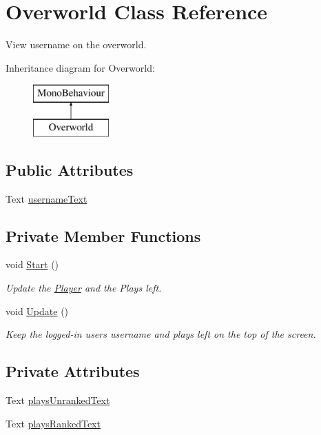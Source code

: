 \hypertarget{class_overworld}{}\section{Overworld Class Reference}
\label{class_overworld}


View username on the overworld.  


Inheritance diagram for Overworld\+:\begin{figure}[H]
\begin{center}
\leavevmode
\includegraphics[height=2.000000cm]{class_overworld}
\end{center}
\end{figure}
\subsection*{Public Attributes}
\begin{DoxyCompactItemize}
\item 
Text \mbox{\hyperlink{class_overworld_ad316e6335a332e6bedcc7bd77b39bd93}{username\+Text}}
\end{DoxyCompactItemize}
\subsection*{Private Member Functions}
\begin{DoxyCompactItemize}
\item 
void \mbox{\hyperlink{class_overworld_a1065dc87edcf287032a56809584feeab}{Start}} ()
\begin{DoxyCompactList}\small\item\em Update the \mbox{\hyperlink{class_player}{Player}} and the Plays left. \end{DoxyCompactList}\item 
void \mbox{\hyperlink{class_overworld_ad5db914c45c35f2c23d3f03cec2117f9}{Update}} ()
\begin{DoxyCompactList}\small\item\em Keep the logged-\/in user\textquotesingle{}s username and plays left on the top of the screen. \end{DoxyCompactList}\end{DoxyCompactItemize}
\subsection*{Private Attributes}
\begin{DoxyCompactItemize}
\item 
Text \mbox{\hyperlink{class_overworld_acc8ed451f9c538a45f30306c09ce25e4}{plays\+Unranked\+Text}}
\item 
Text \mbox{\hyperlink{class_overworld_ac71b777e9c447e4a637bcc6a2b30499a}{plays\+Ranked\+Text}}
\end{DoxyCompactItemize}


